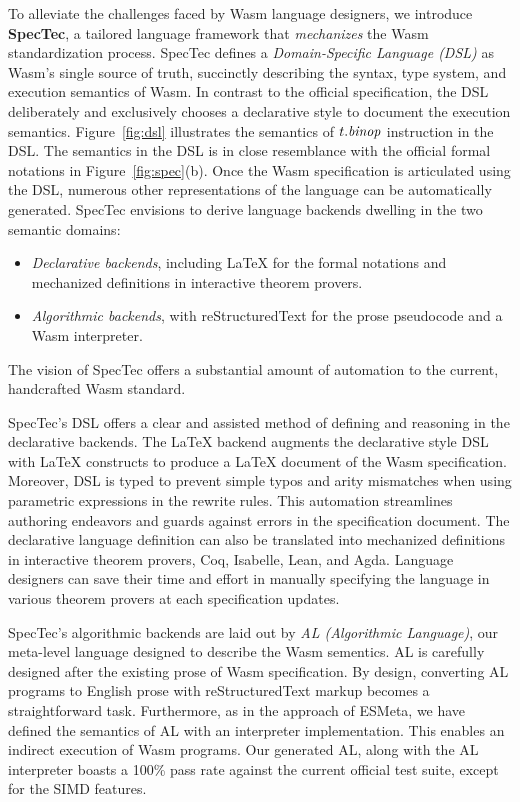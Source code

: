 To alleviate the challenges faced by Wasm language designers, we introduce \textbf{SpecTec}, a tailored language framework that \textit{mechanizes} the Wasm standardization process. 
SpecTec defines a \emph{Domain-Specific Language (DSL)} as Wasm's single source of truth, succinctly describing the syntax, type system, and execution semantics of Wasm. 
In contrast to the official specification, the DSL deliberately and exclusively chooses a declarative style to document the execution semantics. 
Figure~\ref{fig:dsl} illustrates the semantics of $t.\mbox{\emph{binop}}$ instruction in the DSL. 
The semantics in the DSL is in close resemblance with the official formal notations in Figure~\ref{fig:spec}(b). 
Once the Wasm specification is articulated using the DSL, numerous other representations of the language can be automatically generated. 
SpecTec envisions to derive language backends dwelling in the two semantic domains:
\begin{itemize}
  \item
    \textit{Declarative backends}, including LaTeX for the formal notations and mechanized definitions in interactive theorem provers.
  \item
    \textit{Algorithmic backends}, with reStructuredText for the prose pseudocode and a Wasm interpreter.
\end{itemize}
The vision of SpecTec offers a substantial amount of automation to the current, handcrafted Wasm standard. 

SpecTec's DSL offers a clear and assisted method of defining and reasoning in the declarative backends.
The LaTeX backend augments the declarative style DSL with LaTeX constructs to produce a LaTeX document of the Wasm specification. 
Moreover, DSL is typed to prevent simple typos and arity mismatches when using parametric expressions in the rewrite rules. 
This automation streamlines authoring endeavors and guards against errors in the specification document.  
The declarative language definition can also be translated into mechanized definitions in interactive theorem provers, Coq, Isabelle, Lean, and Agda. 
Language designers can save their time and effort in manually specifying the language in various theorem provers at each specification updates. 

SpecTec's algorithmic backends are laid out by \emph{AL (Algorithmic Language)}, our meta-level language designed to describe the Wasm sementics. 
AL is carefully designed after the existing prose of Wasm specification. 
By design, converting AL programs to English prose with reStructuredText markup becomes a straightforward task. 
Furthermore, as in the approach of ESMeta, we have defined the semantics of AL with an interpreter implementation. 
This enables an indirect execution of Wasm programs. 
Our generated AL, along with the AL interpreter boasts a 100\% pass rate against the current official test suite, except for the SIMD features.

